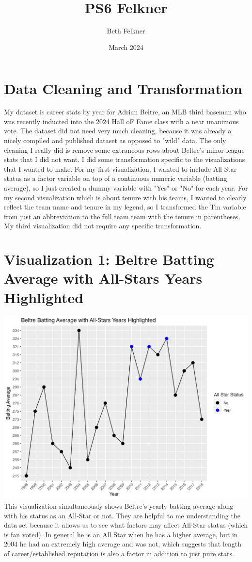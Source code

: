 \documentclass{article}
\title{PS6 Felkner}
\author{Beth Felkner}
\date{March 2024}
\begin{document}
\maketitle

\section{Data Cleaning and Transformation}
My dataset is career stats by year for Adrian Beltre, an MLB third baseman who was recently inducted into the 2024 Hall oF Fame class with a near unanimous vote. The dataset did not need very much cleaning, because it was already a nicely compiled and published dataset as opposed to "wild" data. The only cleaning I really did is remove some extraneous rows about Beltre's minor league stats that I did not want. I did some transformation specific to the visualizations that I wanted to make. For my first visualization, I wanted to include All-Star status as a factor variable on top of a continuous numeric variable (batting average), so I just created a dummy variable with "Yes" or "No" for each year. For my second visualization which is about tenure with his teams, I wanted to clearly reflect the team name and tenure in my legend, so I transformed the Tm variable from just an abbreviation to the full team team with the tenure in parentheses. My third visualization did not require any specific transformation.

\section{Visualization 1: Beltre Batting Average with All-Stars Years Highlighted}
    \centering
    \includegraphics[width=15cm]{PS6a_Felkner.png}
This visualization simultaneously shows Beltre's yearly batting average along with his status as an All-Star or not. They are helpful to me understanding the data set because it allows us to see what factors may affect All-Star status (which is fan voted). In general he is an All Star when he has a higher average, but in 2004 he had an extremely high average and was not, which suggests that length of career/established reputation is also a factor in addition to just pure stats. 
\end{document}
